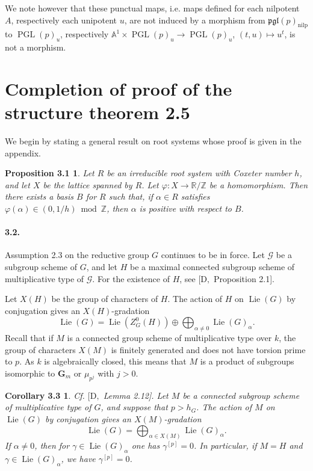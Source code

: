 \documentclass[11pt]{article}
\newcommand{\Lie}{\operatorname{Lie}}
\newcommand{\nilp}{\mathrm{nilp}}
\newtheorem*{proposition31}{Proposition 3.1}
\newtheorem*{corollary33}{Corollary 3.3}
\newcommand{\Gm}{\mathbf G_m}
\newcommand{\PGL}{\operatorname{PGL}}
\begin{document}
We note however that these punctual maps, i.e. maps defined for each nilpotent \(A\),
respectively each unipotent \(u\), are not induced by a morphism from
\(\mathfrak{pgl}(p)_{\nilp}\) to \(\PGL(p)_u\), respectively
\(\mathbb A^1\times\PGL(p)_u\to\PGL(p)_u\), \((t,u)\mapsto u^t\), is not a morphism.

\section{Completion of proof of the structure theorem 2.5}

We begin by stating a general result on root systems whose proof is given in the appendix.

\begin{proposition31}
Let \(R\) be an irreducible root system with Coxeter number \(h\), and let \(X\) be the
lattice spanned by \(R\). Let \(\varphi:X\to\mathbb R/\mathbb Z\) be a homomorphism.
Then there exists a basis \(B\) for \(R\) such that, if \(\alpha\in R\) satisfies
\(\varphi(\alpha)\in (0,1/h)\bmod\mathbb Z\), then \(\alpha\) is positive with respect
to \(B\).
\end{proposition31}

\paragraph{3.2.}
Assumption 2.3 on the reductive group \(G\) continues to be in force. Let \(\mathcal G\)
be a subgroup scheme of \(G\), and let \(H\) be a maximal connected subgroup scheme of
multiplicative type of \(\mathcal G\). For the existence of \(H\), see
\([\mathrm D,\) Proposition 2.1].

Let \(X(H)\) be the group of characters of \(H\). The action of \(H\) on \(\Lie(G)\) by
conjugation gives an \(X(H)\)-gradation
\[
  \Lie(G)=\Lie(Z^0_G(H))\oplus\bigoplus_{\alpha\ne0}\Lie(G)_\alpha.
\]
Recall that if \(M\) is a connected group scheme of multiplicative type over \(k\), the
group of characters \(X(M)\) is finitely generated and does not have torsion prime to
\(p\). As \(k\) is algebraically closed, this means that \(M\) is a product of subgroups
isomorphic to \(\Gm\) or \(\mu_{p^j}\) with \(j>0\).

\begin{corollary33}
Cf. \([\mathrm D,\) Lemma 2.12]. Let \(M\) be a connected subgroup scheme of
multiplicative type of \(G\), and suppose that \(p>h_G\). The action of \(M\) on
\(\Lie(G)\) by conjugation gives an \(X(M)\)-gradation
\[
  \Lie(G)=\bigoplus_{\alpha\in X(M)}\Lie(G)_\alpha.
\]
If \(\alpha\ne0\), then for \(\gamma\in\Lie(G)_\alpha\) one has \(\gamma^{[p]}=0\). In
particular, if \(M=H\) and \(\gamma\in\Lie(G)_\alpha\), we have \(\gamma^{[p]}=0\).
\end{corollary33}
\end{document}

